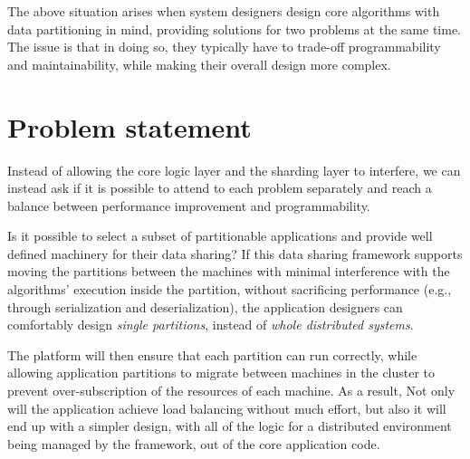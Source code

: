 The above situation arises when system designers design
core algorithms with data partitioning in mind, providing solutions for two
problems at the same time. The issue is that in doing so, they typically have to
trade-off programmability and maintainability, while making their overall design
more complex.

\section{Problem statement}
Instead of allowing the core logic layer and the sharding layer to interfere,
we can instead ask if it is possible to attend to each problem separately and
reach a balance between performance improvement and programmability.

Is it possible to select a subset of partitionable applications
and provide well defined machinery for their data sharing? If this data sharing
framework supports moving the partitions between the machines with minimal
interference with the algorithms' execution inside the partition, without
sacrificing performance (e.g., through serialization and deserialization), the
application designers can comfortably design \emph{single partitions}, instead
of \emph{whole distributed systems}.

The platform will then ensure that each partition can run correctly, while
allowing application partitions to migrate between machines in the cluster
to prevent over-subscription of the resources of each machine. As a result,
Not only will the application achieve load balancing without
much effort,
but also it will end up with a simpler design, with all
of the logic for a distributed environment being managed by the framework,
out of the core application code.

